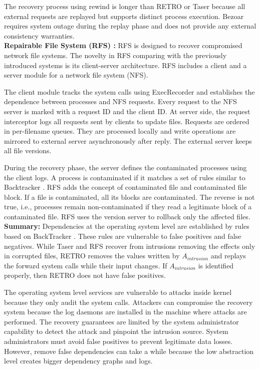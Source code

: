 The recovery process using rewind is longer than RETRO or Taser because all external requests are replayed but supports distinct process execution. Bezoar requires system outage during the replay phase and does not provide any external consistency warranties.\\


\textbf{Repairable File System (RFS) \cite{rfs}:} RFS is designed to recover compromised network file systems. The novelty in RFS comparing with the previously introduced systems is its client-server architecture. RFS includes a client and a server module for a network file system (NFS).

The client module tracks the system calls using ExecRecorder \cite{Oliveira2006} and establishes the dependence between processes and NFS requests. Every request to the NFS server is marked with a request ID and the client ID. At server side, the request interceptor logs all requests sent by clients to update files. Requests are ordered in per-filename queues. They are processed locally and write operations are mirrored to external server asynchronously after reply. The external server keeps all file versions. 

During the recovery phase, the server defines the contaminated processes using the client logs. A process is contaminated if it matches a set of rules similar to Backtracker \cite{backtracker}. RFS adds the concept of contaminated file and contaminated file block. If a file is contaminated, all its blocks are contaminated. The reverse is not true, i.e., processes remain non-contaminated if they read a legitimate block of a contaminated file. RFS uses the version server to rollback only the affected files. \\



\textbf{Summary:} Dependencies at the operating system level are established by rules based on BackTracker \cite{backtracker}. These rules are vulnerable to false positives and false negatives. While Taser \cite{taser} and RFS \cite{rfs} recover from intrusions removing the effects only in corrupted files, RETRO \cite{retro} removes the values written by $A_{intrusion}$ and replays the forward system calls while their input changes. If $A_{intrusion}$ is identified properly, then RETRO does not have false positives.

The operating system level services are vulnerable to attacks inside kernel because they only audit the system calls. Attackers can compromise the recovery system because the log daemons are installed in the machine where attacks are performed. The recovery guarantees are limited by the system administrator capability to detect the attack and pinpoint the intrusion source. System administrators must avoid false positives to prevent legitimate data losses. However, remove false dependencies can take a while because the low abstraction level creates bigger dependency graphs and logs.




